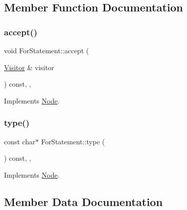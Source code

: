 \subsection{Member Function Documentation}
\mbox{\label{struct_for_statement_acc3a0ac5de61092f0d7be7921b31d47d}} 
\subsubsection{\texorpdfstring{accept()}{accept()}}
{\footnotesize\ttfamily void For\+Statement\+::accept (\begin{DoxyParamCaption}\item[{\hyperlink{struct_visitor}{Visitor} \&}]{visitor }\end{DoxyParamCaption}) const\hspace{0.3cm}{\ttfamily [inline]}, {\ttfamily [override]}, {\ttfamily [virtual]}}



Implements \hyperlink{struct_node_a10bd7af968140bbf5fa461298a969c71}{Node}.

\mbox{\label{struct_for_statement_acf0f64ddd1a41763f15af08813b0bea6}} 
\subsubsection{\texorpdfstring{type()}{type()}}
{\footnotesize\ttfamily const char$\ast$ For\+Statement\+::type (\begin{DoxyParamCaption}{ }\end{DoxyParamCaption}) const\hspace{0.3cm}{\ttfamily [inline]}, {\ttfamily [override]}, {\ttfamily [virtual]}}



Implements \hyperlink{struct_node_a82f29420d0a38efcc370352528e94e9b}{Node}.



\subsection{Member Data Documentation}
\mbox{\label{struct_for_statement_a8d9018f1d05bcd027122c9dcabb0e3ba}} 
